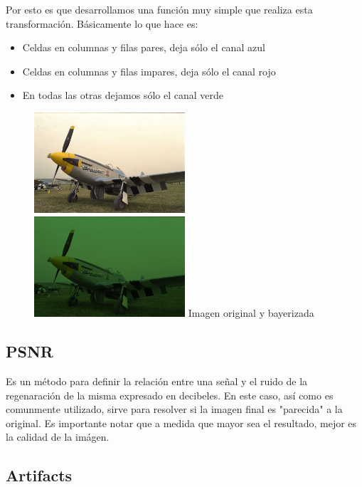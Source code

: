 Por esto es que desarrollamos una función muy simple que realiza esta transformación. Básicamente lo que hace es: 
\begin{itemize}
\item Celdas en columnas y filas pares, deja sólo el canal azul
\item Celdas en columnas y filas impares, deja sólo el canal rojo
\item En todas las otras dejamos sólo el canal verde
\end{itemize}   


\begin{figure}[h]
       \includegraphics[width=0.5\textwidth]{imagenes/img9.png}
           \hfill
        \includegraphics[width=0.5\textwidth]{imagenes/img9_bayer.png}   
        Imagen original y bayerizada
\end{figure}
\newpage

\subsection{PSNR}
Es un método para definir la relación entre una señal y el ruido de la regenaración de la misma expresado en decibeles. En este caso, así como es comunmente utilizado, sirve para resolver si la imagen final es "parecida" a la original. Es importante notar que a medida que mayor sea el resultado, mejor es la calidad de la imágen.


\subsection{Artifacts}

